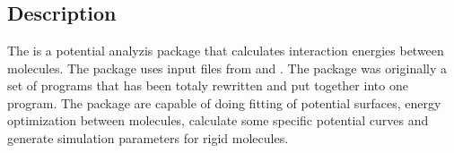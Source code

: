 \section{}
\label{UG:sec:nemo}

\subsection{Description}
\label{UG:sec:nemo_description}

The  is a potential analyzis package that calculates interaction energies between molecules. The package uses input files from  and .
The package was originally a set of programs that has been totaly rewritten and put together into one program. The package
are capable of doing fitting of potential surfaces, energy optimization between molecules, calculate some specific potential curves and generate simulation parameters for rigid molecules.

